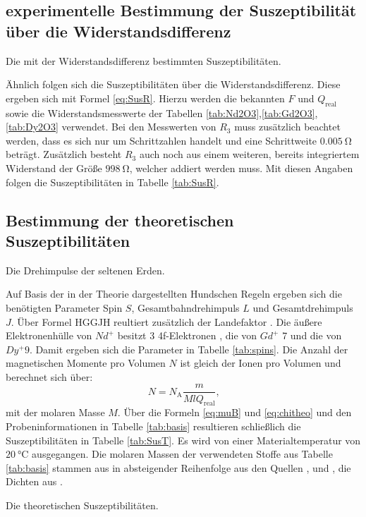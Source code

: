 \subsection{experimentelle Bestimmung der Suszeptibilität über die Widerstandsdifferenz}


\begin{table}
 \centering
 \caption{Die mit der Widerstandsdifferenz bestimmten Suszeptibilitäten.}
 
 \label{tab:SusR}
\end{table}


Ähnlich folgen sich die Suszeptibilitäten über die Widerstandsdifferenz. Diese ergeben sich mit Formel
\ref{eq:SusR}. Hierzu werden die bekannten $F$ und $Q_\text{real}$ sowie die Widerstandsmesswerte
der Tabellen \ref{tab:Nd2O3},\ref{tab:Gd2O3},\ref{tab:Dy2O3} verwendet.
Bei den Messwerten von $R_3$ muss zusätzlich beachtet werden, dass es sich nur
um Schrittzahlen handelt und eine Schrittweite $\SI{0.005}{\ohm}$ beträgt.
Zusätzlich besteht $R_3$ auch noch aus einem weiteren, bereits integriertem Widerstand
der Größe $\SI{998}{\ohm}$, welcher addiert werden muss. Mit diesen Angaben folgen die Suszeptibilitäten in Tabelle \ref{tab:SusR}.


\subsection{Bestimmung der theoretischen Suszeptibilitäten}

\begin{table}
 \centering
 \caption{Die Drehimpulse der seltenen Erden.}
 
 \label{tab:spins}
\end{table}


Auf Basis der in der Theorie dargestellten Hundschen Regeln ergeben sich die
benötigten Parameter Spin $S$, Gesamtbahndrehimpuls $L$ und Gesamtdrehimpuls $J$. Über Formel
HGGJH reultiert zusätzlich der Landefaktor . Die äußere Elektronenhülle von $Nd^+ $
besitzt 3 4f-Elektronen , die von $Gd^+ $  7 und die von
$Dy^+ 9$. Damit ergeben sich die Parameter in Tabelle \ref{tab:spins}.
Die Anzahl der magnetischen Momente pro Volumen $N$ ist gleich der Ionen pro
Volumen und berechnet sich über:
\begin{equation}
  N = N_\text{A}\frac{m}{M l Q_\text{real}}\text{,}
\end{equation}
mit der molaren Masse $M$.
Über die Formeln \ref{eq:muB} und \ref{eq:chitheo} und den Probeninformationen in
Tabelle \ref{tab:basis} resultieren schließlich die Suszeptibilitäten in Tabelle \ref{tab:SusT}.
Es wird von einer Materialtemperatur von $\SI{20}{\degreeCelsius}$ ausgegangen. Die
molaren Massen der verwendeten Stoffe aus Tabelle \ref{tab:basis} stammen aus in
absteigender Reihenfolge aus den Quellen \cite{MNd2O3}, \cite{MGd2O3} und \cite{MDy2O3}, die Dichten aus \cite{V606}.

\begin{table}
 \centering
 \caption{Die theoretischen Suszeptibilitäten.}
 
 \label{tab:SusT}
\end{table}
